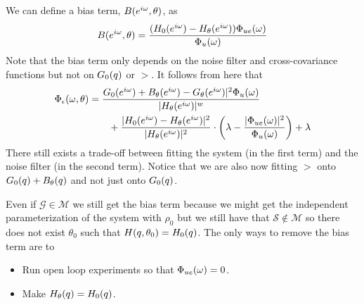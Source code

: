 We can define a bias term, $B(e^{i\omega},\theta)$, as
$$B(e^{i\omega},\theta) = \frac{(H_0(e^{i\omega})-H_\theta(e^{i\omega}))\Phi_{ue}(\omega)}{\Phi_u(\omega)}$$
Note that the bias term only depends on the noise filter and cross-covariance functions but not on $G_0(q)$ or $\gt$. It follows from here that
\begin{align*}
\Phi_\epsilon(\omega,\theta) &= \frac{G_0(e^{i\omega})+B_\theta(e^{i\omega})-G_\theta(e^{i\omega})|^2\Phi_u(\omega)}{|H_\theta(e^{i\omega})|^w} \\
&\qquad + \frac{|H_0(e^{i\omega})-H_\theta(e^{i\omega})|^2}{|H_\theta(e^{i\omega})|^2}\cdot \left(\lambda-\frac{|\Phi_{ue}(\omega)|^2}{\Phi_u(\omega)}\right) + \lambda
\end{align*}
There still exists a trade-off between fitting the system (in the first term) and the noise filter (in the second term). Notice that we are also now fitting $\gt$ onto $G_0(q)+B_\theta(q)$ and not just onto $G_0(q)$.

Even if $\mathcal{G}\in\mathcal{M}$ we still get the bias term because we might get the independent parameterization of the system with $\rho_0$ but we still have that $\mathcal{S}\notin\mathcal{M}$ so there does not exist $\theta_0$ such that $H(q,\theta_0)=H_0(q)$. The only ways to remove the bias term are to
\begin{itemize}
\item Run open loop experiments so that $\Phi_{ue}(\omega)=0$.
\item Make $H_\theta(q)=H_0(q)$.
\end{itemize}


